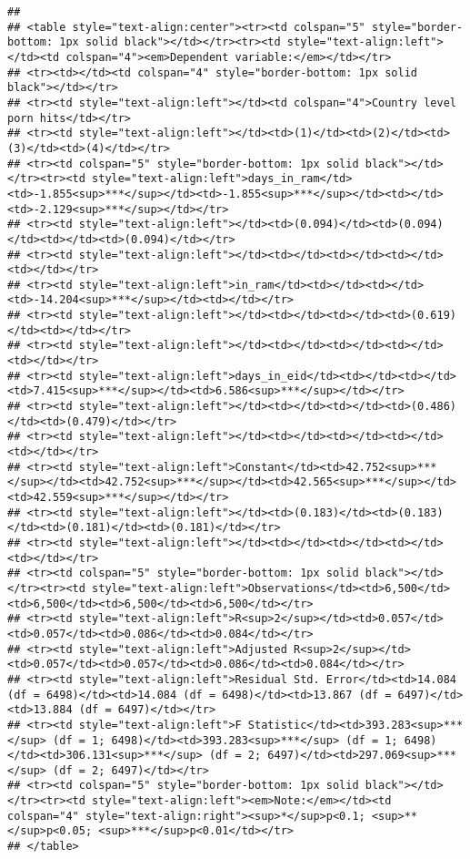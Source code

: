 \documentclass[]{article}
\begin{document}
\begin{verbatim}
## 
## <table style="text-align:center"><tr><td colspan="5" style="border-bottom: 1px solid black"></td></tr><tr><td style="text-align:left"></td><td colspan="4"><em>Dependent variable:</em></td></tr>
## <tr><td></td><td colspan="4" style="border-bottom: 1px solid black"></td></tr>
## <tr><td style="text-align:left"></td><td colspan="4">Country level porn hits</td></tr>
## <tr><td style="text-align:left"></td><td>(1)</td><td>(2)</td><td>(3)</td><td>(4)</td></tr>
## <tr><td colspan="5" style="border-bottom: 1px solid black"></td></tr><tr><td style="text-align:left">days_in_ram</td><td>-1.855<sup>***</sup></td><td>-1.855<sup>***</sup></td><td></td><td>-2.129<sup>***</sup></td></tr>
## <tr><td style="text-align:left"></td><td>(0.094)</td><td>(0.094)</td><td></td><td>(0.094)</td></tr>
## <tr><td style="text-align:left"></td><td></td><td></td><td></td><td></td></tr>
## <tr><td style="text-align:left">in_ram</td><td></td><td></td><td>-14.204<sup>***</sup></td><td></td></tr>
## <tr><td style="text-align:left"></td><td></td><td></td><td>(0.619)</td><td></td></tr>
## <tr><td style="text-align:left"></td><td></td><td></td><td></td><td></td></tr>
## <tr><td style="text-align:left">days_in_eid</td><td></td><td></td><td>7.415<sup>***</sup></td><td>6.586<sup>***</sup></td></tr>
## <tr><td style="text-align:left"></td><td></td><td></td><td>(0.486)</td><td>(0.479)</td></tr>
## <tr><td style="text-align:left"></td><td></td><td></td><td></td><td></td></tr>
## <tr><td style="text-align:left">Constant</td><td>42.752<sup>***</sup></td><td>42.752<sup>***</sup></td><td>42.565<sup>***</sup></td><td>42.559<sup>***</sup></td></tr>
## <tr><td style="text-align:left"></td><td>(0.183)</td><td>(0.183)</td><td>(0.181)</td><td>(0.181)</td></tr>
## <tr><td style="text-align:left"></td><td></td><td></td><td></td><td></td></tr>
## <tr><td colspan="5" style="border-bottom: 1px solid black"></td></tr><tr><td style="text-align:left">Observations</td><td>6,500</td><td>6,500</td><td>6,500</td><td>6,500</td></tr>
## <tr><td style="text-align:left">R<sup>2</sup></td><td>0.057</td><td>0.057</td><td>0.086</td><td>0.084</td></tr>
## <tr><td style="text-align:left">Adjusted R<sup>2</sup></td><td>0.057</td><td>0.057</td><td>0.086</td><td>0.084</td></tr>
## <tr><td style="text-align:left">Residual Std. Error</td><td>14.084 (df = 6498)</td><td>14.084 (df = 6498)</td><td>13.867 (df = 6497)</td><td>13.884 (df = 6497)</td></tr>
## <tr><td style="text-align:left">F Statistic</td><td>393.283<sup>***</sup> (df = 1; 6498)</td><td>393.283<sup>***</sup> (df = 1; 6498)</td><td>306.131<sup>***</sup> (df = 2; 6497)</td><td>297.069<sup>***</sup> (df = 2; 6497)</td></tr>
## <tr><td colspan="5" style="border-bottom: 1px solid black"></td></tr><tr><td style="text-align:left"><em>Note:</em></td><td colspan="4" style="text-align:right"><sup>*</sup>p<0.1; <sup>**</sup>p<0.05; <sup>***</sup>p<0.01</td></tr>
## </table>
\end{verbatim}
\end{document}
